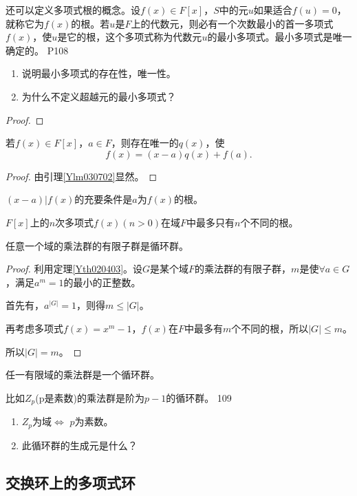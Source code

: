 \original
{
	还可以定义多项式根的概念。设$f(x)\in F[x]$，$S$中的元$u$如果适合$f(u)=0$，就称它为$f(x)$的根。若$u$是$F$上的代数元，则必有一个次数最小的首一多项式$f(x)$，使$u$是它的根，这个多项式称为代数元$u$的最小多项式。最小多项式是唯一确定的。
}
{P108}

\begin{proposition}
	\begin{enumerate}
		\item 说明最小多项式的存在性，唯一性。
		\item 为什么不定义超越元的最小多项式？
	\end{enumerate}
\end{proposition}

\begin{proof}
	
\end{proof}

\begin{lemma}[余数定理]
	若$f(x)\in F[x]$，$a\in F$，则存在唯一的$q(x)$，使
	\begin{equation*}
		f(x)=(x-a)q(x)+f(a).
	\end{equation*}
\end{lemma}
\begin{proof}
	由引理\ref{Ylm030702}显然。
\end{proof}

\begin{corollary}
	$(x-a)\big| f(x) $的充要条件是$a$为$f(x)$的根。
\end{corollary}

\begin{theorem}
	$F[x]$上的$n$次多项式$f(x)(n>0)$在域$F$中最多只有$n$个不同的根。
\end{theorem}

\begin{theorem}
	任意一个域的乘法群的有限子群是循环群。
\end{theorem}
\begin{proof}
	利用定理\ref{Yth020403}。设$G$是某个域$F$的乘法群的有限子群，$m$是使$\forall a\in G$，满足$a^{m}=1$的最小的正整数。\par
	首先有，$a^{|G|}=1$，则得$m\leq |G|$。\par
	再考虑多项式$f(x)=x^{m}-1$，$f(x)$在$F$中最多有$m$个不同的根，所以$|G|\leq m$。\par
	所以$|G|=m$。
\end{proof}
\begin{corollary}
	任一有限域的乘法群是一个循环群。
\end{corollary}

\original
{
	比如$Z_{p}$(p是素数)的乘法群是阶为$p-1$的循环群。
}{109}
\begin{proposition}
	\begin{enumerate}
		\item $Z_{p}$为域$\Leftrightarrow$ $p$为素数。
		\item 此循环群的生成元是什么？
	\end{enumerate}
\end{proposition}


\subsection{交换环上的多项式环}



